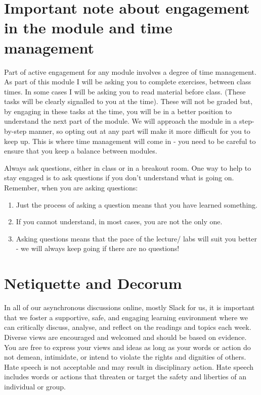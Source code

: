 \documentclass{article}
\begin{document}
\pagebreak
\section{Important note about engagement in the module  and time management}
 Part of active engagement  for any module involves a degree of time management. 
 As part of this module I will be asking you to complete exercises, between class times. In some cases I will be asking you to read material before class. 
 (These tasks will be clearly signalled to you at the time). These will not be graded but, by engaging in these tasks at the time, you will be in a better position to 
 understand the next part of the module. We will approach the module in a step-by-step manner, so opting out at any part will make it more difficult for you to keep up. 
 This is where time management will come in - you need to be careful to ensure that you keep a balance between modules. 
 
 Always ask questions, either in class or in a breakout room.  One way to help to stay engaged is to ask questions if you don't understand what is going on. 
 Remember, when you are asking questions:
 \begin{enumerate}
    \item Just the process of asking a question means that you have learned something. 
    \item If you cannot understand, in most cases, you are not the only one. 
    \item Asking questions means that the pace of the lecture/ labs will suit you better - we will always keep going if there are no questions! 
 \end{enumerate}

 \section{Netiquette and Decorum}
 In all of our asynchronous discussions online, mostly Slack for us,  it is important that we foster a supportive, safe, 
 and engaging learning environment where we can critically discuss, analyse, and reflect on the 
 readings and topics each week. Diverse views are encouraged and welcomed and should be based on evidence. 
 You are free to express your views and ideas as long as your words or action do not demean, intimidate, or intend
  to violate the rights and dignities of others. Hate speech is not acceptable and may result in disciplinary action. 
 Hate speech includes words or actions that threaten or target the safety and liberties of an individual or group.
   
\end{document}
